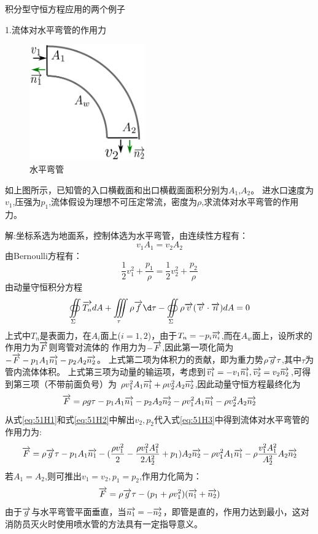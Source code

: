 
积分型守恒方程应用的两个例子

1.流体对水平弯管的作用力
\begin{figure}[!ht]
\centering
\includegraphics[width=5cm]{horizontal_tube.eps}
\caption{水平弯管}\label{fig:511}
\end{figure}

如上图所示，已知管的入口横截面和出口横截面面积分别为$A_1$,$A_2$。
进水口速度为$v_1$,压强为$p_1$,流体假设为理想不可压定常流，密度为$\rho$,求流体对水平弯管的作用力。

解:坐标系选为地面系，控制体选为水平弯管，由连续性方程有：
\begin{equation}\label{eq:51H1}
v_1A_1=v_2A_2
\end{equation}
由Bernoulli方程有：
\begin{equation}\label{eq:51H2}
\frac{1}{2}v_1^2+\frac{p_1}{\rho}=\frac{1}{2}v_2^2+\frac{p_2}{\rho}
\end{equation}
由动量守恒积分方程
\begin{equation*}
\oiint\limits_{\Sigma} \v{T_n} dA+\iiint\limits_{\tau}\rho\v{f}\d\tau
-\oiint\limits_{\Sigma}\rho\v{v}(\v{v}\cdot\v{n})dA=0
\end{equation*}
上式中$T_n$是表面力，在$A_i$面上($i=1,2$)，由于$T_n=-p_i\overrightarrow{n_i}$,而在$A_w$面上，设所求的作用力为$\overrightarrow{F}$则弯管对流体的
作用力为$-\overrightarrow{F}$,因此第一项化简为$-\overrightarrow{F}-p_1A_1\overrightarrow{n_1}-p_2A_2\overrightarrow{n_2}$。
上式第二项为体积力的贡献，即为重力势$\rho \overrightarrow{g} \tau$,其中$\tau$为管内流体体积。
上式第三项为动量的输运项，考虑到$\overrightarrow{v_1}=-v_1\overrightarrow{n_1},\overrightarrow{v_2}=v_2\overrightarrow{n_2}$,可得到第三项（不带前面负号）为
$\rho v_1^2 A_1\overrightarrow{n_1}+\rho v_2^2 A_2\overrightarrow{n_2}$,因此动量守恒方程最终化为
\begin{equation}\label{eq:51H3}
\overrightarrow{F}=\rho g \tau -p_1A_1\overrightarrow{n_1}-p_2A_2\overrightarrow{n_2} - \rho v_1^2 A_1\overrightarrow{n_1} - \rho v_2^2 A_2\overrightarrow{n_2}
\end{equation}
从式\eqref{eq:51H1}和式\eqref{eq:51H2}中解出$v_2,p_2$代入式\eqref{eq:51H3}中得到流体对水平弯管的作用力为:
\begin{equation}
\overrightarrow{F}=\rho \overrightarrow{g} \tau -p_1A_1\overrightarrow{n_1}-(\frac{\rho v_1^2}{2}-\frac{\rho v_1^2A_1^2}{2A_2^2}+p_1)A_2\overrightarrow{n_2} - \rho v_1^2 A_1\overrightarrow{n_1} - \rho \frac{v_1^2A_1^2}{A_2^2} A_2\overrightarrow{n_2}
\end{equation}
若$A_1=A_2$,则可推出$v_1=v_2,p_1=p_2$,作用力化简为：
\begin{equation}
\overrightarrow{F}=\rho \overrightarrow{g} \tau -(p_1+\rho v_1^2)(\overrightarrow{n_1}+\overrightarrow{n_2})
\end{equation}
由于$\overrightarrow{g}$与水平弯管平面垂直，当$\overrightarrow{n_1}=-\overrightarrow{n_2}$，即管是直的，作用力达到最小，这对消防员灭火时使用喷水管的方法具有一定指导意义。

